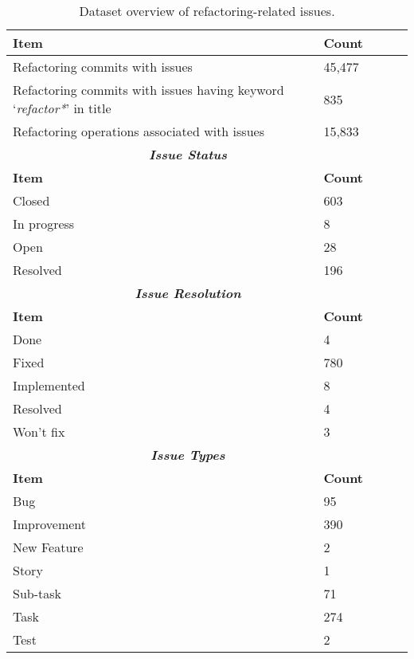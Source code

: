 \begin{table}[h!]
\begin{center}
\caption{Dataset overview of refactoring-related issues.}

\label{Table:DATA_Overview}
\begin{adjustbox}{width=0.35\textwidth,center}
\begin{tabular}{lllll}\hline
\toprule
\bfseries Item & \bfseries Count \\
\midrule
Refactoring commits with issues & 45,477 \\
Refactoring commits with issues having keyword `\textit{refactor*}' in title & 835 \\
Refactoring operations associated with issues &  15,833 \\
\midrule
\multicolumn{2}{c}{\textbf{\textit{Issue Status}}}\\
\bfseries Item & \bfseries Count  \\
\midrule
Closed & 603 \\
In progress & 8 \\
Open & 28 \\
Resolved & 196 \\
\midrule
\multicolumn{2}{c}{\textbf{\textit{Issue Resolution}}}\\
\bfseries Item & \bfseries Count  \\
\midrule
Done & 4 \\
Fixed & 780 \\
Implemented & 8 \\
Resolved & 4 \\
Won't fix & 3 \\
\midrule
\multicolumn{2}{c}{\textbf{\textit{Issue Types}}}\\
\bfseries Item & \bfseries Count  \\
\midrule
Bug & 95 \\
Improvement & 390 \\
New Feature & 2\\
Story & 1\\
Sub-task & 71 \\
Task & 274 \\
Test & 2 \\
\bottomrule
\end{tabular}
\end{adjustbox}
\end{center}
\end{table}